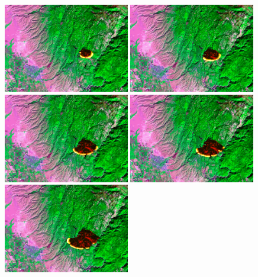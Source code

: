 \documentclass{article}
\begin{document}
    \begin{figure}
        \includegraphics[width=0.49\textwidth]{resources/wildfire.overlay.015.png}\hfill
        \includegraphics[width=0.49\textwidth]{resources/wildfire.overlay.026.png}        
        \\[\smallskipamount]
        \includegraphics[width=0.49\textwidth]{resources/wildfire.overlay.040.png}\hfill
        \includegraphics[width=0.49\textwidth]{resources/wildfire.overlay.047.png}
        \\[\smallskipamount]
        \includegraphics[width=0.49\textwidth]{resources/wildfire.overlay.057.png}\hfill

\end{figure}
\end{document}
